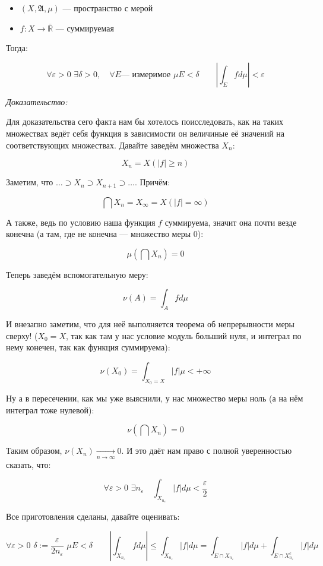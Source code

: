 \documentclass{article}
\def\dbl{\,\,}
\def\rinf{\overline{\mathbb{R}}}
\def\goesto#1{\underset{#1}{\longrightarrow}}
\def\toinf#1{\goesto{#1 \rightarrow \infty}}
\def\ntoinf{\toinf{n}}
\begin{document}
\begin{itemize}
    \item $(X, \mathfrak{A}, \mu)$ --- пространство с мерой
    \item $f: X \rightarrow \rinf$ --- суммируемая
\end{itemize}

Тогда:

\[\forall \varepsilon > 0 \dbl \exists \delta > 0, \quad \forall E\text{--- измеримое} \dbl \mu E < \delta \qquad \left|\int_{E} f d \mu\right| < \varepsilon\]

\textit{Доказательство:}

Для доказательства сего факта нам бы хотелось поисследовать, как на таких множествах ведёт себя функция в зависимости он величиные её значений на соответствующих множествах. Давайте заведём множества $X_n$:

\[X_n = X(|f| \ge n)\]

Заметим, что $\ldots \supset X_n \supset X_{n + 1} \supset \ldots$. Причём:

\[\bigcap X_n = X_{\infty} = X(|f| = \infty)\]

А также, ведь по условию наша функция $f$ суммируема, значит она почти везде конечна (а там, где не конечна --- множество меры 0):

\[\mu \left( \bigcap X_n \right) = 0\]

Теперь заведём вспомогательную меру:

\[ \nu(A) = \int_{A} f d\mu\]

И внезапно заметим, что для неё выполняется теорема об непрерывности меры сверху! ($X_0 = X$, так как там у нас условие модуль больший нуля, и интеграл по нему конечен, так как функция суммируема):

\[\nu(X_0) = \int_{X_0 = X} |f| \mu < +\infty\]

Ну а в пересечении, как мы уже выяснили, у нас множество меры ноль (а на нём интеграл тоже нулевой):

\[\nu\left( \bigcap X_n \right) = 0\]

Таким образом, $\nu(X_n) \ntoinf 0$. И это даёт нам право с полной уверенностью сказать, что:

\[\forall \varepsilon > 0 \dbl \exists n_\varepsilon \quad \int_{X_{n_\varepsilon}} |f| d\mu < \frac{\varepsilon}{2}\]

Все приготовления сделаны, давайте оценивать:

\[\forall \varepsilon > 0 \dbl \delta := \frac{\varepsilon}{2 n_{\varepsilon}} \dbl \mu E < \delta \qquad \left|\int_{X_{n_\varepsilon}} f d\mu\right| \le \int_{X_{n_\varepsilon}} |f| d\mu = \int_{E \cap X_{n_\varepsilon}} |f| d\mu + \int_{E \cap X^c_{n_{\varepsilon}}} |f| d\mu\]
\end{document}
